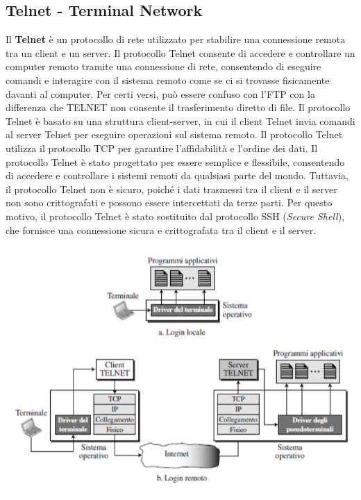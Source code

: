 \documentclass[12pt]{report}
\begin{document}
	\subsection{Telnet - Terminal Network}
	Il \textbf{Telnet} è un protocollo di rete utilizzato per stabilire una connessione remota tra un client e un server. Il protocollo Telnet consente di accedere e controllare un computer remoto tramite una connessione di rete, consentendo di eseguire comandi e interagire con il sistema remoto come se ci si trovasse fisicamente davanti al computer. Per certi versi, può essere confuso con l'FTP con la differenza che TELNET non consente il trasferimento diretto di file. Il protocollo Telnet è basato su una struttura client-server, in cui il client Telnet invia comandi al server Telnet per eseguire operazioni sul sistema remoto. Il protocollo Telnet utilizza il protocollo TCP per garantire l'affidabilità e l'ordine dei dati. Il protocollo Telnet è stato progettato per essere semplice e flessibile, consentendo di accedere e controllare i sistemi remoti da qualsiasi parte del mondo. Tuttavia, il protocollo Telnet non è sicuro, poiché i dati trasmessi tra il client e il server non sono crittografati e possono essere intercettati da terze parti. Per questo motivo, il protocollo Telnet è stato sostituito dal protocollo SSH (\textit{Secure Shell}), che fornisce una connessione sicura e crittografata tra il client e il server.
	\begin{center}
		\includegraphics[scale=0.5]{assets/telnet.png}
	\end{center}
\end{document}
